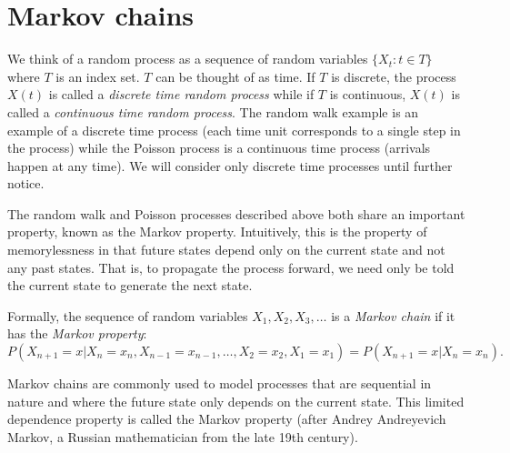 \documentclass[11pt]{article}
\begin{document}
\section{Markov chains}

We think of a random process as a sequence of random variables $\{X_t: t\in T \}$ where $T$ is an index set. $T$ can be thought of as time.   If $T$ is discrete, the process $X(t)$ is called a {\em discrete time random process} while if $T$ is continuous, $X(t)$ is called a {\em continuous time random process}.    The random walk example is an example of a discrete time process (each time unit corresponds to a single step in the process) while the Poisson process is a continuous time process (arrivals happen at any time).  We will consider only discrete time processes until further notice.


The random walk and Poisson processes described above both share an important property, known as the Markov property.  Intuitively, this is the property of memorylessness in that future states depend only on the current state and not any past states.  That is, to propagate the process forward, we need only be told the current state to generate the next state.  


Formally, the sequence of random variables $X_1,X_2, X_3,\ldots$ is a {\em Markov chain} if it has the {\em Markov property}:   
\[P(X_{n+1} = x | X_n = x_n, X_{n-1} = x_{n-1},\ldots,X_2 = x_2,X_1=x_1) = P(X_{n+1} = x |X_n = x_n).\]

Markov chains are commonly used to model processes that are sequential in nature and where the  future state only depends on the current state.  This limited dependence property is called the Markov property (after Andrey Andreyevich Markov, a Russian mathematician from the late 19th century).  
\end{document}
